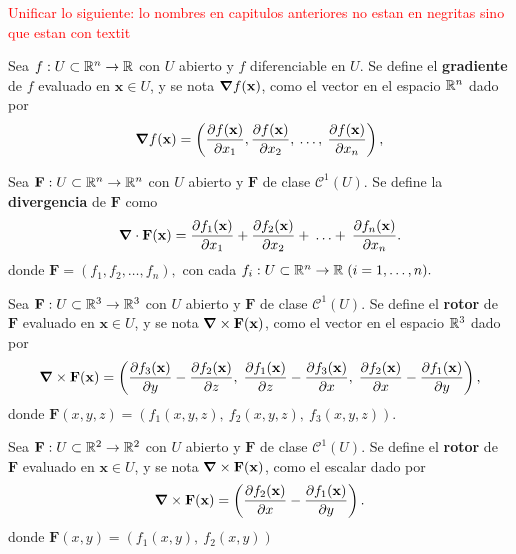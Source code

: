 
\textcolor{red}{Unificar lo siguiente:  lo nombres en capitulos anteriores no estan en negritas sino que estan con textit }

\begin{definition}
    Sea $f:U\subset\mathbb{R}^n\to\mathbb{R}$ con $U$ abierto y $f$ diferenciable en $U$.   Se define el \textbf{gradiente} de $f$ evaluado en $\mathbf{x}\in U$, y se nota $\grad f(\mathbf{x})$,  como el vector en el espacio $\mathbb{R}^n$ dado por 
    \[
        \grad f(\mathbf{x})=\left(\frac{\partial f(\mathbf{x})}{\partial x_1},\frac{\partial f(\mathbf{x})}{\partial x_2},\:\ldots,\: \frac{\partial f(\mathbf{x})}{\partial x_n}\right),
    \]
  \end{definition}


\begin{definition}
    Sea $\mathbf{F}:U\subset\mathbb{R}^n\to\mathbb{R}^n$ con  $U$ abierto y $\mathbf{F}$ de clase $\mathcal{C}^1(U)$. Se define la \textbf{divergencia} de $\mathbf{F}$ como
    \[
        \grad\cdot \mathbf{F}(\mathbf{x})=\frac{\partial f_1(\mathbf{x})}{\partial x_1}+\frac{\partial f_2(\mathbf{x})}{\partial x_2}+\:\ldots+\: \frac{\partial f_n(\mathbf{x})}{\partial x_n}.
    \]
    donde $\mathbf{F}=(f_1,f_2,\ldots,f_n),$ con cada $f_i :U\subset\mathbb{R}^n \to\mathbb{R}\;(i=1,\ldots,n).$
\end{definition}


\begin{definition}
    Sea $\mathbf{F}:U\subset\mathbb{R}^3\to\mathbb{R}^3$ con $U$ abierto y $\mathbf{F}$ de clase $\mathcal{C}^1(U)$. Se define el \textbf{rotor} de $\mathbf{F}$  evaluado en $\mathbf{x}\in U$, y se nota  $\grad\times\mathbf{F}(\mathbf{x})$,   como el vector en el espacio $\mathbb{R}^3$ dado por 
    \[
        \grad\times\mathbf{F}(\mathbf{x})=\left(\frac{\partial f_3(\mathbf{x})}{\partial y}-\frac{\partial f_2(\mathbf{x})}{\partial z},\;\frac{\partial f_1(\mathbf{x})}{\partial z}-\frac{\partial f_3(\mathbf{x})}{\partial x},\;\frac{\partial f_2(\mathbf{x})}{\partial x}-\frac{\partial f_1(\mathbf{x})}{\partial y}\right),
    \]   
    donde $\mathbf{F}(x,y,z)=(f_1(x,y,z),\:f_2(x,y,z),\:f_3(x,y,z))$.
  
  
    Sea $\mathbf{F}:U\subset\mathbb{R}^2\to\mathbb{R}^2$   con $U$ abierto y $\mathbf{F}$ de clase $\mathcal{C}^1(U)$. Se define el \textbf{rotor} de $\mathbf{F}$  evaluado en $\mathbf{x}\in U$, y se nota  $\grad\times\mathbf{F}(\mathbf{x})$,   como el escalar dado por
    \[
        \grad\times\mathbf{F}(\mathbf{x})=\left(\frac{\partial f_2(\mathbf{x})}{\partial x}-\frac{\partial f_1(\mathbf{x})}{\partial y}\right).
    \]
     donde $\mathbf{F}(x,y)=(f_1(x,y),\:f_2(x,y))$
\end{definition}



